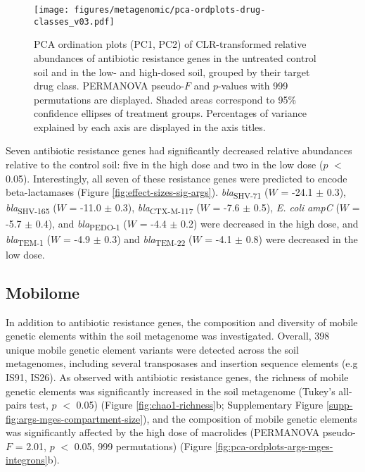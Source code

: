 \begin{figure}[htpb]
	\centering
		\texttt{[image: figures/metagenomic/pca-ordplots-drug-classes\_v03.pdf]}
	\caption[PCA ordination plots (PC1, PC2) of CLR-transformed relative abundances of antibiotic resistance genes in the untreated control soil and in the low- and high-dosed soil, grouped by their target drug class.]{
		PCA ordination plots (PC1, PC2) of CLR-transformed relative abundances of antibiotic resistance genes in the untreated control soil and in the low- and high-dosed soil, grouped by their target drug class.
		PERMANOVA pseudo-$F$ and $p$-values with 999 permutations are displayed.
		Shaded areas correspond to 95\% confidence ellipses of treatment groups.
		Percentages of variance explained by each axis are displayed in the axis titles.
	}
	\label{fig:pca-ordplots-drug-classes}
\end{figure}

Seven antibiotic resistance genes had significantly decreased relative abundances relative to the control soil: five in the high dose and two in the low dose ($p$ $<$ 0.05).
Interestingly, all seven of these resistance genes were predicted to encode beta-lactamases (Figure \ref{fig:effect-sizes-sig-args}).
\textit{bla}\textsubscript{SHV-71} ($W$ = -24.1 $\pm$ 0.3), \textit{bla}\textsubscript{SHV-165} ($W$ = -11.0 $\pm$ 0.3), \textit{bla}\textsubscript{CTX-M-117} ($W$ = -7.6 $\pm$ 0.5), \textit{E. coli} \textit{ampC} ($W$ = -5.7 $\pm$ 0.4), and \textit{bla}\textsubscript{PEDO-1} ($W$ = -4.4 $\pm$ 0.2) were decreased in the high dose, and \textit{bla}\textsubscript{TEM-1} ($W$ = -4.9 $\pm$ 0.3) and \textit{bla}\textsubscript{TEM-22} ($W$ = -4.1 $\pm$ 0.8) were decreased in the low dose.

\subsection{Mobilome}

In addition to antibiotic resistance genes, the composition and diversity of mobile genetic elements within the soil metagenome was investigated.
Overall, 398 unique mobile genetic element variants were detected across the soil metagenomes, including several transposases and insertion sequence elements (e.g IS91, IS26).
As observed with antibiotic resistance genes, the richness of mobile genetic elements was significantly increased in the soil metagenome (Tukey’s all-pairs test, $p$ $<$ 0.05) (Figure \ref{fig:chao1-richness}b; Supplementary Figure \ref{supp-fig:args-mges-compartment-size}), and the composition of mobile genetic elements was significantly affected by the high dose of macrolides (PERMANOVA pseudo-$F$ = 2.01, $p$ $<$ 0.05, 999 permutations) (Figure \ref{fig:pca-ordplots-args-mges-integrons}b).


